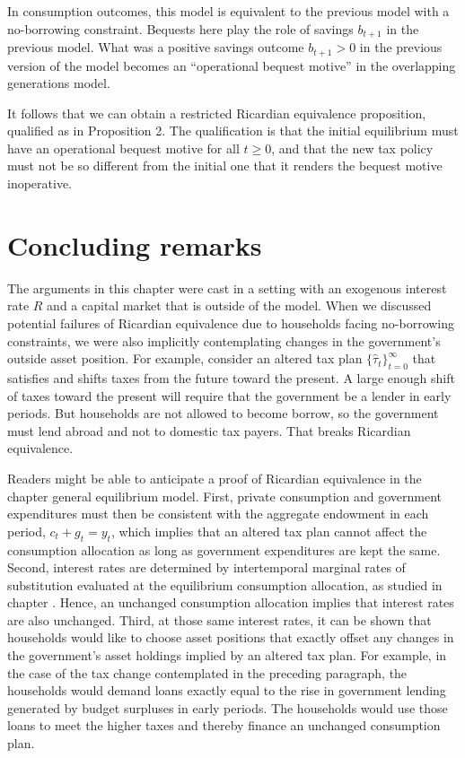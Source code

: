 In consumption outcomes, this model is equivalent to the previous model
with a no-borrowing constraint.  Bequests here play the
role of savings $b_{t+1}$ in the previous model.  What was a positive
savings outcome $b_{t+1} >0$  in the previous version of the
model becomes an ``operational bequest motive'' in the overlapping
generations model.

  It follows that we can obtain a restricted Ricardian
equivalence proposition, qualified as in Proposition 2.
The qualification is that the initial equilibrium must have an operational
bequest motive for all $t \geq 0$, and that the new
tax policy must not be so different from  the initial one
that it renders the bequest motive inoperative.

\supereject  %


\section{Concluding remarks}%
The arguments in this chapter were cast in a setting with
an exogenous interest rate $R$ and a capital market that is outside of the
model. When we discussed potential failures of Ricardian equivalence due to
households facing no-borrowing constraints, we were also implicitly
contemplating changes in the government's outside asset position. For example,
consider an altered tax plan $\{\hat \tau_t\}_{t=0}^\infty$ that satisfies 
and shifts taxes  from the future toward the present. A
large enough shift of taxes toward the present  will require  that the government be a lender
in early periods. But  households are not allowed to become borrow, so
the government must lend abroad and not to domestic tax payers. That breaks Ricardian equivalence.

Readers might be able to  anticipate
a proof of Ricardian
equivalence in the chapter  general equilibrium model.
 First, private consumption and government
expenditures must then be consistent with the aggregate endowment in each
period, $c_t+g_t=y_t$, which implies that an altered tax plan cannot
affect the consumption allocation as long as government expenditures
are kept the same. Second, interest rates are determined by intertemporal
marginal rates
of substitution evaluated at the equilibrium consumption allocation, as
studied in chapter .
 Hence, an unchanged consumption allocation implies
that interest rates are also unchanged.
Third, at those same interest rates, it can be shown that households
would like to choose asset positions that exactly offset any changes in
the government's asset holdings implied by an altered tax plan.
For example, in the case of the tax change contemplated in the preceding
paragraph, the households would demand loans exactly equal to the
rise in government lending generated by budget surpluses in early periods.
The households would use those loans to meet the higher taxes and thereby
 finance an unchanged consumption plan.

